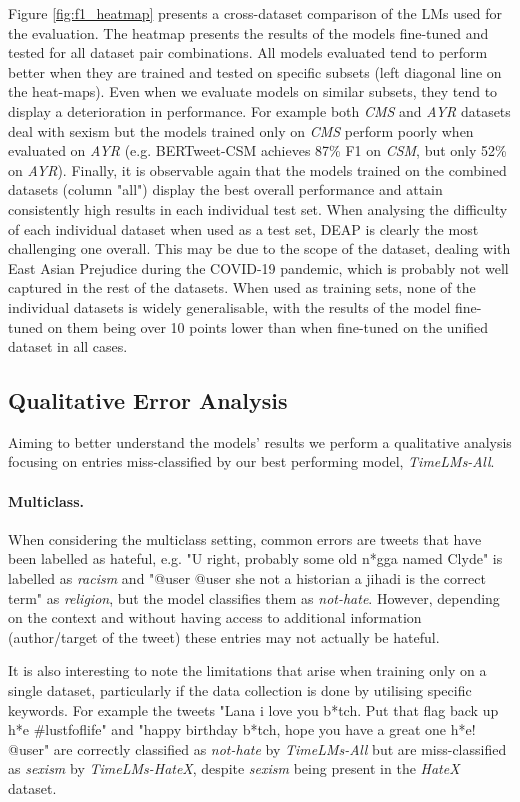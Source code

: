 Figure \ref{fig:f1_heatmap} presents a cross-dataset comparison of the \acp{LM} used for the evaluation. The heatmap presents the results of the models fine-tuned and tested for all dataset pair combinations. All models evaluated tend to perform better when they are trained and tested on specific subsets (left diagonal line on the heat-maps). Even when we evaluate models on similar subsets, they tend to display a deterioration in performance. For example both \textit{CMS} and \textit{AYR} datasets deal with sexism but the models trained only on \textit{CMS} perform poorly when evaluated on \textit{AYR} (e.g. BERTweet-CSM achieves 87\% F1 on \textit{CSM}, but only 52\% on \textit{AYR}). Finally, it is observable again that the models trained on the combined datasets (column "all") display the best overall performance and attain consistently high results in each individual test set. When analysing the difficulty of each individual dataset when used as a test set, DEAP is clearly the most challenging one overall.  This may be due to the scope of the dataset, dealing with East Asian Prejudice during the COVID-19 pandemic, which is probably not well captured in the rest of the datasets. When used as training sets, none of the individual datasets is widely generalisable, with the results of the model fine-tuned on them being over 10 points lower than when fine-tuned on the unified dataset in all cases.

\subsection{Qualitative Error Analysis}
Aiming to better understand the models' results we perform a qualitative analysis focusing on entries miss-classified by our best performing model, \textit{TimeLMs-All}.

\paragraph{Multiclass.} When considering the multiclass setting, common errors are tweets that have been labelled as hateful,   e.g. "U right, probably some old n*gga named Clyde" is labelled as \textit{racism} and "@user @user she not a historian a jihadi is the correct term" as \textit{religion}, but the model classifies them as \textit{not-hate}. However, depending on the context and without having access to additional information (author/target of the tweet) these entries may not actually be hateful. 

It is also interesting to note the limitations that arise when training only on a single dataset, particularly if the data collection is done by utilising specific keywords. For example the tweets "Lana i love you b*tch. Put that flag back up h*e \#lustfoflife" and "happy birthday b*tch, hope you have a great one h*e! @user" are correctly classified as \textit{not-hate} by \textit{TimeLMs-All} but are miss-classified as \textit{sexism} by \textit{TimeLMs-HateX}, despite \textit{sexism} being present in the \textit{HateX} dataset.

